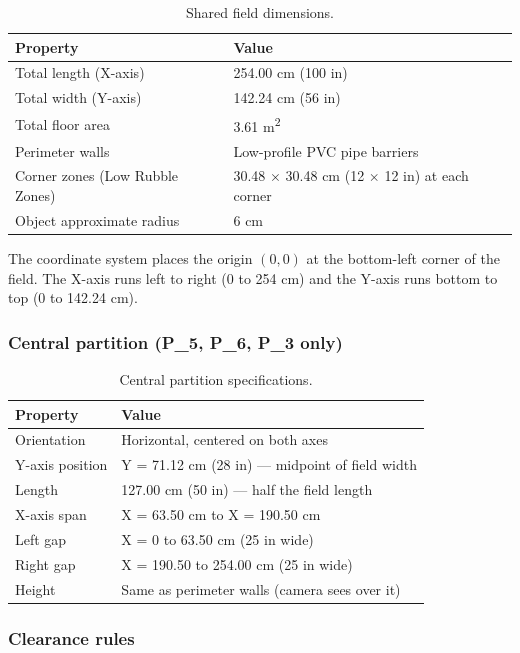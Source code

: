 \documentclass[a4]{article}
\begin{document}
\begin{table}[H]
\centering
\begin{tabular}{ll}
\toprule
\textbf{Property} & \textbf{Value} \\
\midrule
Total length (X-axis) & 254.00 cm (100 in) \\
Total width (Y-axis) & 142.24 cm (56 in) \\
Total floor area & 3.61 m\textsuperscript{2} \\
Perimeter walls & Low-profile PVC pipe barriers \\
Corner zones (Low Rubble Zones) & 30.48 $\times$ 30.48 cm (12 $\times$ 12 in) at each corner \\
Object approximate radius & 6 cm \\
\bottomrule
\end{tabular}
\caption{Shared field dimensions.}
\end{table}

The coordinate system places the origin $(0, 0)$ at the bottom-left corner of the field. The X-axis runs left to right (0 to 254 cm) and the Y-axis runs bottom to top (0 to 142.24 cm).

\subsubsection*{Central partition (P\_5, P\_6, P\_3 only)}

\begin{table}[H]
\centering
\begin{tabular}{ll}
\toprule
\textbf{Property} & \textbf{Value} \\
\midrule
Orientation & Horizontal, centered on both axes \\
Y-axis position & Y = 71.12 cm (28 in) --- midpoint of field width \\
Length & 127.00 cm (50 in) --- half the field length \\
X-axis span & X = 63.50 cm to X = 190.50 cm \\
Left gap & X = 0 to 63.50 cm (25 in wide) \\
Right gap & X = 190.50 to 254.00 cm (25 in wide) \\
Height & Same as perimeter walls (camera sees over it) \\
\bottomrule
\end{tabular}
\caption{Central partition specifications.}
\end{table}

\subsubsection*{Clearance rules}
\end{document}
